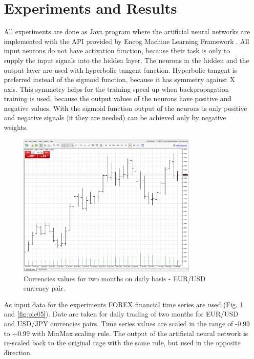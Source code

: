 \documentclass[11pt]{article}
\begin{document}
\section{Experiments and Results} \label{Experiments and Results}

All experiments are done as Java program where the artificial neural networks are implemented with the API provided by Encog Machine Learning Framework \cite{heaton01}. All input neurons do not have activation function, because their task is only to supply the input signals into the hidden layer. The neurons in the hidden and the output layer are used with hyperbolic tangent function. Hyperbolic tangent is preferred instead of the sigmoid function, because it has symmetry against X axis. This symmetry helps for the training speed up when backpropagation training is used, because the output values of the neurons have positive and negative values. With the sigmoid function output of the neurons is only positive and negative signals (if they are needed) can be achieved only by negative weights. 

\begin{figure}[ht!]
   \centering
     \includegraphics[width=0.8\textwidth]{pic04}
    \caption {Currencies values for two months on daily basis - EUR/USD currency pair.}
\label{fig:pic04}
\end{figure}
\FloatBarrier

As input data for the experiments FOREX financial time series are used (Fig. \ref{fig:pic04} and \ref{fig:pic05}). Date are taken for daily trading of two months for EUR/USD and USD/JPY currencies pairs. Time series values are scaled in the range of -0.99 to +0.99 with MinMax scaling rule. The output of the artificial neural network is re-scaled back to the original rage with the same rule, but used in the opposite direction. 
\end{document}
